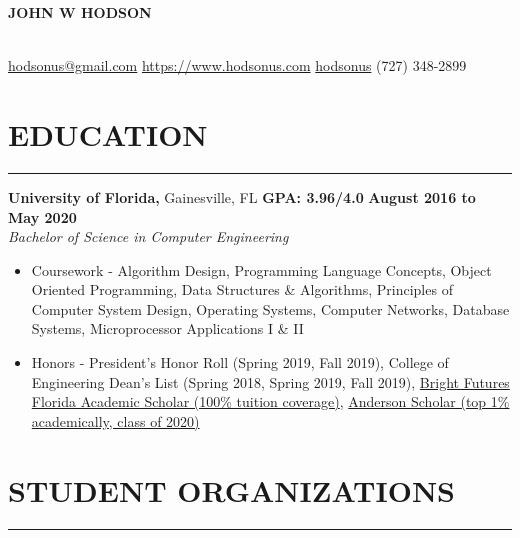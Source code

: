 \documentclass[11pt]{article} %
\begin{document}
	
	\noindent\centerline{ \huge\textbf{JOHN W HODSON}}\\
	
	\noindent
	\faEnvelopeSquare \space\href{mailto:hodsonus@gmail.com}{hodsonus@gmail.com} \hspace*{\fill}
	\faHome \space \href{https://www.hodsonus.com}{https://www.hodsonus.com} \hspace*{\fill}
	\faGithub \space \href{https://github.com/hodsonus}{hodsonus} \hspace*{\fill}
	\faMobilePhone \space (727) 348-2899\\
	
	\section*{EDUCATION}
		\hrule \relax
		\vspace{.4cm}
		
		\noindent \textbf{University of Florida,} Gainesville, FL
		\hfill\textbf{GPA: 3.96/4.0}
		\hfill\textbf{August 2016 to May 2020}\\
		\textit{Bachelor of Science in Computer Engineering}
		\begin{itemize}[noitemsep,nolistsep, label = {-}]
			\item  Coursework - 
											Algorithm Design,
											Programming Language Concepts,
											Object Oriented Programming,
											Data Structures \& Algorithms,
											Principles of Computer System Design,
											Operating Systems,
											Computer Networks,
											Database Systems,
											Microprocessor Applications I \& II
			\item  Honors - 
											President's Honor Roll (Spring 2019, Fall 2019),
											College of Engineering Dean\rq s List (Spring 2018, Spring 2019, Fall 2019),
											\href{https://www.sfa.ufl.edu/types-of-aid/bright-futures/}{Bright Futures Florida Academic Scholar (100\% tuition coverage)},
											\href{https://sites.clas.ufl.edu/clas-main/undergraduate/anderson-scholars/anderson-scholars-listing/}{Anderson Scholar (top 1\% academically, class of 2020)}
		\end{itemize}
		
		\vspace{.20cm}
		
	\section*{STUDENT ORGANIZATIONS}
	\hrule \relax
	\vspace{.4cm}
		
\end{document}
